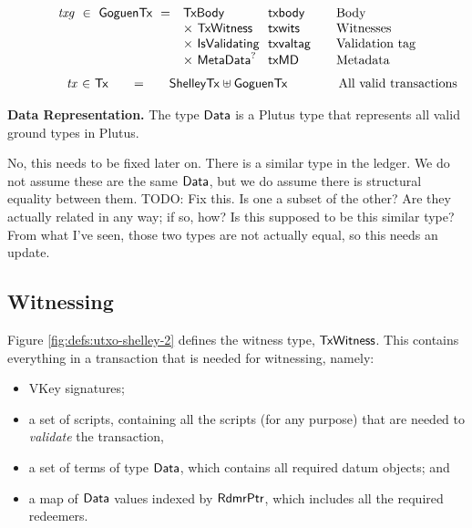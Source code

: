 \begin{figure*}[htb]
\begin{equation*}
\begin{array}{r@{~~}l@{~~}l@{\qquad}l}
      \var{txg} ~\in~ \GoguenTx ~=~
      & \TxBody & \fun{txbody} & \text{Body}\\
      & \times ~\TxWitness & \fun{txwits} & \text{Witnesses}\\
      & \times ~\IsValidating & \fun{txvaltag}&\text{Validation tag}\\
      & \times ~\MetaData^? & \fun{txMD}&\text{Metadata}\\
    \end{array}
  \end{equation*}
  \begin{equation*}
    \begin{array}{r@{~\in~}l@{\qquad=\qquad}l@{\qquad\qquad}l}
\qquad\qquad      \var{tx} & \Tx & \ShelleyTx \uniondistinct \GoguenTx &
      \text{All valid transactions}\\
    \end{array}
  \end{equation*}
  \caption{Definitions for transactions, cont.}
  \label{fig:defs:utxo-shelley-2}
\end{figure*}


\textbf{Data Representation.}
The type $\mathsf{Data}$ is a Plutus type that represents all valid ground types in Plutus.
\begin{note}
  No, this needs to be fixed later on.
There is a similar type in the
ledger. We do not assume these are the same $\mathsf{Data}$, but we do assume there
is structural equality between them. TODO: {Fix this.  Is one a subset of the other?  Are they actually related in any way; if so, how?}
  Is this supposed to be this similar type? From what I've seen, those
  two types are not actually equal, so this needs an update.
\end{note}

\subsection{Witnessing}
Figure \ref{fig:defs:utxo-shelley-2} defines the witness type, $\mathsf{TxWitness}$.  This contains everything
in a transaction that is needed for witnessing, namely:

\begin{itemize}
  \item VKey signatures;
  \item a set of scripts, containing all the scripts (for any purpose) that are needed to \emph{validate} the transaction,
  \item a set of terms of type $\mathsf{Data}$, which contains all required datum objects; and
  \item a map of $\mathsf{Data}$ values indexed by $\mathsf{RdmrPtr}$, which includes all the
  required redeemers.
\end{itemize}

